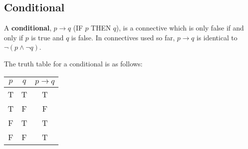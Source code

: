 \subsection{Conditional}


\begin{defn}
  \label{defn:conditional}
  A \textbf{conditional}, $ p \rightarrow q$ (IF $p$ THEN $q$), is a connective which is only false if and only if $p$ is true and $q$ is false.
  In connectives used so far, $p \rightarrow q$ is identical to $\neg (p \land \neg q)$.

  \begin{comment}
  \begin{itemize}
    \item[Modus Ponens] If $p$ is True, then the truth hinges on $q$.
    \item[Transitive] If $p \rightarrow q$ and $q \rightarrow r$, then $p \rightarrow r$ must also be true.
    \item[Contraposition] If $p \rightarrow q$ is True, then so must $\neg q \rightarrow p$.
    \item[Reductio]
  \end{itemize}
  \end{comment}

\end{defn}

The truth table for a conditional is as follows:

\begin{minipage}{\linewidth}
  \centering
  \begin{tabular}{c|c|c}
    $p$ & $q$ & $p \rightarrow q$ \\
    \hline
    T & T & T \\
    T & F & F \\
    F & T & T \\
    F & F & T \\
  \end{tabular}
   \label{tab:conditonal} 
\end{minipage}

